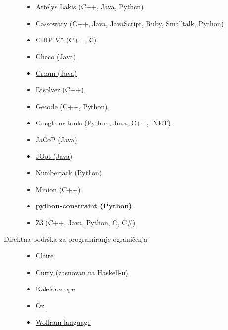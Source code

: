 \documentclass[../main.tex]{subfiles}
\begin{document}
\begin{description}
		\begin{itemize}
			\item \href{https://www.artelys.com/en/optimization-tools/kalis}
					{Artelys Lakis (C++, Java, Python)}
			\item \href{https://constraints.cs.washington.edu/cassowary/}
					{Cassowary (C++, Java, JavaScript, Ruby, Smalltalk, Python)}
			\item \href{http://www.cosytec.com/production_scheduling/chip/chip_technology.htm}
					{CHIP V5 (C++, C)}
			\item \href{http://choco-solver.org/}
					{Choco (Java)}
			\item \href{http://bach.istc.kobe-u.ac.jp/cream/}
					{Cream (Java)}
			\item \href{http://research.microsoft.com/apps/pubs/default.aspx?id=64335}
					{Disolver (C++)}
			\item \href{http://www.gecode.org/}
					{Gecode (C++, Python)}
			\item \href{https://github.com/google/or-tools}
					{Google or-tools (Python, Java, C++, .NET)}
			\item \href{http://jacop.osolpro.com/}
					{JaCoP (Java)}
			\item \href{http://jopt.sourceforge.net/}
					{JOpt (Java)}
			\item \href{http://numberjack.ucc.ie/}
					{Numberjack (Python)}
			\item \href{http://constraintmodelling.org/minion/}
					{Minion (C++)}
			\item \href{http://labix.org/python-constraint}
					{\underline{\bf python-constraint (Python)}}
			\item \href{https://github.com/Z3Prover/z3}
					{Z3 (C++, Java, Python, C, C\#)}				
		\end{itemize}

	\item[Direktna podrška za programiranje ograničenja] \hfill
		\begin{itemize}
			\item \href{http://www.claire-language.com/}
					{Claire}
			\item \href{http://www-ps.informatik.uni-kiel.de/currywiki/}
					{Curry (zasnovan na Haskell-u)}
			\item \href{https://constraints.cs.washington.edu/cip/kaleidoscope-asi.html}
					{Kaleidoscope}
			\item \href{http://strasheela.sourceforge.net/strasheela/doc/01-Basics.html}
					{Oz}
			\item \href{https://www.wolfram.com/language/}
					{Wolfram language}
		\end{itemize}
		
\end{description}
\end{document}
